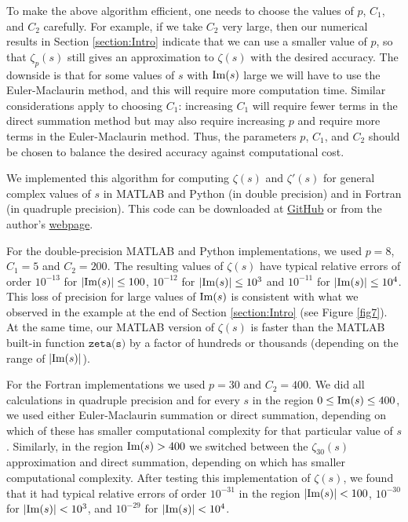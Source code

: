 \documentclass[12pt]{article}
\def\im{\textnormal {Im}}
\theoremstyle{definition}
\begin{document}
To make the above algorithm efficient, one needs to choose the values of $p$, $C_1$, and $C_2$ carefully. 
For example,  if we take $C_2$ very large, 
then our numerical results in Section \ref{section:Intro} indicate that we can use a smaller value of $p$, so that $\zeta_p(s)$ still gives an approximation to $\zeta(s)$ with the desired accuracy. The downside is that for some values of $s$ with $\im(s)$ large we will have to use the Euler-Maclaurin method, and this will require more computation time. Similar considerations apply to choosing $C_1$: increasing $C_1$ will require fewer terms in the direct summation method but may also require increasing $p$ and require more terms in the Euler-Maclaurin method. Thus, the parameters $p$, $C_1$, and $C_2$
should be chosen to balance the desired accuracy against computational cost.   

We implemented this algorithm for computing $\zeta(s)$ and $\zeta'(s)$ for general complex values of $s$ in MATLAB and Python (in double precision) and in Fortran (in quadruple precision). This code can be downloaded at 
\href{https://github.com/Alexey-Kuznetsov-math/Riemann_zeta-and-Gamma}{GitHub} or from the author's \href{https://kuznetsovmath.ca/}{webpage}. 

For the double-precision MATLAB and Python implementations, we used $p=8$, $C_1=5$ and $C_2=200$. The resulting values of $\zeta(s)$ have typical relative errors of order 
$10^{-13}$ for $|\im(s)|\le 100$, $10^{-12}$ for $|\im(s)|\le 10^3$ and $10^{-11}$ for $|\im(s)|\le 10^4$. 
This loss of precision for large values of $\im(s)$ is consistent with what we observed in the example at the end of Section \ref{section:Intro} (see Figure \ref{fig7}). At the same time, our MATLAB version of $\zeta(s)$ is faster than the MATLAB built-in function ${\texttt{zeta(s)}}$ by a factor of hundreds or thousands  (depending on the range of $|\im(s)|$).

For the Fortran implementations we used $p=30$ and $C_2=400$. We did all calculations in quadruple precision and for every $s$ in the region $0\le \im(s)\le 400$,  we used either Euler-Maclaurin summation or direct summation, depending on which of these has smaller computational complexity for that particular value of $s$. Similarly, in the region $\im(s)>400$ we switched between the $\zeta_{30}(s)$ approximation and direct summation, depending on which has smaller computational complexity. After testing this implementation of $\zeta(s)$, we found that it had typical relative errors of order $10^{-31}$  in the region $|\im(s)| < 100$, $10^{-30}$ for $|\im(s)| < 10^3$, and $10^{-29}$ for $|\im(s)| <10^4$. 
\end{document}

